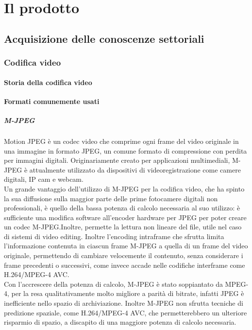 \chapter{Il prodotto\label{cap:ilprodotto}}
\section{Acquisizione delle conoscenze settoriali}
   \subsection{Codifica video}
      \subsubsection{Storia della codifica video}
      \subsubsection{Formati comunemente usati}
            \paragraph{M-JPEG}
            Motion JPEG  è un codec video che comprime ogni frame del video originale in una immagine in formato JPEG, un comune formato di compressione con perdita per immagini digitali. Originariamente creato per applicazioni multimediali, M-JPEG è attualmente utilizzato da dispositivi di videoregistrazione come camere digitali, IP cam e webcam.
            \\
            Un grande vantaggio dell'utilizzo di M-JPEG per la codifica video, che ha spinto la sua diffusione sulla maggior parte delle prime fotocamere digitali non professionali, è quello della bassa potenza di calcolo necessaria al suo utilizzo: è sufficiente una modifica software all'encoder hardware per JPEG per poter creare un codec M-JPEG.\@ Inoltre, permette la lettura non lineare del file, utile nel caso di sistemi di video editing. Inoltre l'encoding intraframe che sfrutta limita l'informazione contenuta in ciascun frame M-JPEG a quella di un frame del video originale, permettendo di cambiare velocemente il contenuto, senza considerare i frame precedenti o successivi, come invece accade nelle codifiche interframe come H.264/MPEG-4 AVC.\@
            \\
            Con l'accrescere della potenza di calcolo, M-JPEG  è stato soppiantato da MPEG-4, per la resa qualitativamente molto migliore a parità di bitrate, infatti JPEG è inefficiente nello spazio di archiviazione. Inoltre M-JPEG non sfrutta tecniche di predizione spaziale, come H.264/MPEG-4 AVC, che permetterebbero un ulteriore risparmio di spazio, a discapito di una maggiore potenza di calcolo necessaria.

